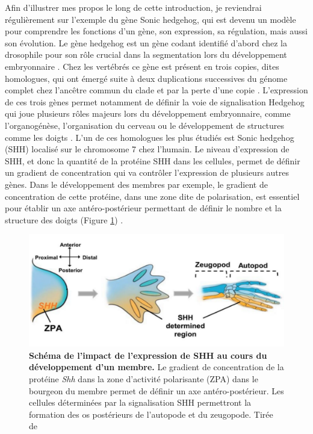 Afin d’illustrer mes propos le long de cette introduction, je reviendrai régulièrement sur l’exemple du gène Sonic hedgehog, qui est devenu un modèle pour comprendre les fonctions d’un gène, son expression, sa régulation, mais aussi son évolution. Le gène hedgehog est un gène codant identifié d’abord chez la drosophile pour son rôle crucial dans la segmentation lors du développement embryonnaire \citep{nusslein-volhard_mutations_1980}. Chez les vertébrés ce gène est présent en trois copies, dites homologues, qui ont émergé suite à deux duplications successives du génome complet chez l’ancêtre commun du clade et par la perte d’une copie \citep{dehal_two_2005}. L’expression de ces trois gènes permet notamment de définir la voie de signalisation Hedgehog qui joue plusieurs rôles majeurs lors du développement embryonnaire, comme l’organogénèse, l’organisation du cerveau ou le développement de structures comme les doigts \citep{lum_hedgehog_2004}. L’un de ces homologues les plus étudiés est Sonic hedgehog (\acrshort{SHH}) localisé sur le chromosome 7 chez l’humain. Le niveau d’expression de \acrshort{SHH}, et donc la quantité de la protéine \acrshort{SHH} dans les cellules, permet de définir un gradient de concentration qui va contrôler l’expression de plusieurs autres gènes. Dans le développement des membres par exemple, le gradient de concentration de cette protéine, dans une zone dite de polarisation, est essentiel pour établir un axe antéro-postérieur permettant de définir le nombre et la structure des doigts (Figure \ref{fig:Fig1}) \citep{riddle_sonic_1993, echelard_sonic_1993}.

\begin{figure}[h]
 \centering
 \includegraphics[width=1\textwidth, page=1] {figures/introduction/fig1.png}
 \caption[Schéma de l'impact de l'expression de \acrshort{SHH} au cours du développement d'un membre.]{
 \textbf{Schéma de l'impact de l'expression de \acrshort{SHH} au cours du développement d'un membre.} Le gradient de concentration de la protéine \textit{Shh} dans la zone d'activité polarisante (ZPA) dans le bourgeon du membre permet de définir un axe antéro-postérieur. Les cellules déterminées par la signalisation SHH
permettront la formation des os postérieurs de l'autopode et du zeugopode. Tirée de \citet{lezot_shh_2020}
 }
 \label{fig:Fig1}
\end{figure} 


